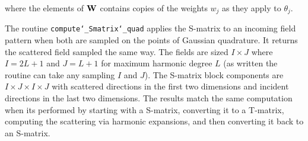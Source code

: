 \noindent where the elements of $\mathbf{W}$ contains copies of the weights $w_j$ as they apply to $\theta_j$.  

The routine \texttt{compute\char`_Smatrix\char`_quad} applies the S-matrix to an incoming field pattern when both are sampled on the points of Gaussian quadrature.  It returns the scattered field sampled the same way.  The fields are sized $I \times J$ where $I = 2L + 1$ and $J = L+1$ for maximum harmonic degree $L$ (as written the routine can take any sampling $I$ and $J$). The S-matrix block components are $I \times J \times I \times J$ with scattered directions in the first two dimensions and incident directions in the last two dimensions. The results match the same computation when its performed by starting with a S-matrix, converting it to a T-matrix, computing the scattering via harmonic expansions, and then converting it back to an S-matrix. 


{\footnotesize
{}
}






